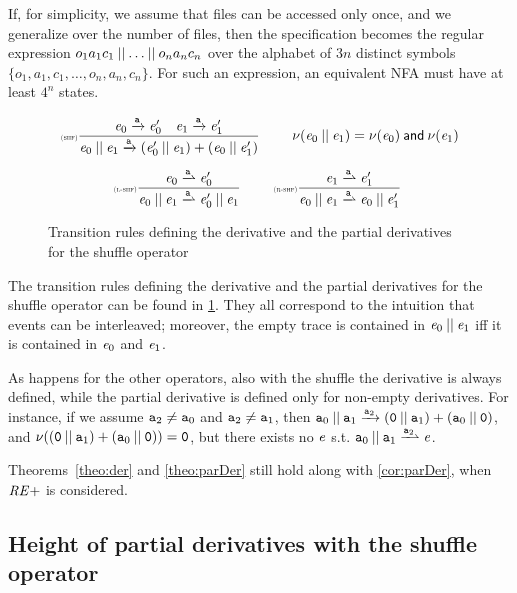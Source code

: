 If, for simplicity, we assume that files can be accessed only once, and we generalize over the number of files, then the specification becomes the regular expression $o_1 a_1 c_1\mathbin{||}\ldots\mathbin{||} o_n a_n  c_n$ over the alphabet of $3n$ distinct symbols $\{o_1,a_1,c_1,\dots, o_n,a_n,c_n\}$. For such an expression, an equivalent NFA must have at least
$4^n$ states.

\begin{figure}[h]
 $$
  \begin{array}{c}
   \Rule{shf}{\re_0\der{\sym}\re'_0\quad\re_1\der{\sym}\re'_1}{\re_0\shuffleop\re_1\der{\sym}(\re'_0\shuffleop\re_1)\orop(\re_0\shuffleop\re'_1)}{}\qquad \hasEps{\re_0\shuffleop\re_1}=\hasEps{\re_0}\conj\hasEps{\re_1} \\[4ex]
   \Rule{l-shf}{\re_0\parDer{\sym}\re'_0}{\re_0\shuffleop\re_1\parDer{\sym}\re'_0\shuffleop\re_1}{} \qquad
   \Rule{r-shf}{\re_1\parDer{\sym}\re'_1}{\re_0\shuffleop\re_1\parDer{\sym}\re_0\shuffleop\re'_1}{}
  \end{array}
 $$
 \caption{Transition rules defining the derivative and the partial derivatives for the shuffle operator}
 \label{fig:shfParDer}
\end{figure}

The transition rules defining the derivative and the partial derivatives for the shuffle operator
can be found in \cref{fig:shfParDer}. They all correspond to the intuition that events can be interleaved; moreover, the empty trace is contained in $\mathit {e}_0\mathbin{||}\mathit {e}_1$ iff it is contained in $\mathit {e}_0$ and $\mathit {e}_1$.

As happens for the other operators, also with the shuffle  the derivative is always defined, while the partial derivative is defined only for non-empty derivatives. For instance, if we assume $\mathtt {a}_2\neq\mathtt {a}_0$ and $\mathtt {a}_2\neq\mathtt {a}_1$, then
$\mathtt {a}_0\mathbin{||} \mathtt {a}_1\xrightarrow{\mathtt {a}_2}(\mathtt {0}\mathbin{||}\mathtt {a}_1)\mathbin{+}(\mathtt {a}_0\mathbin{||}\mathtt {0})$, and $\nu({(\mathtt {0}\mathbin{||}\mathtt {a}_1)\mathbin{+}(\mathtt {a}_0\mathbin{||}\mathtt {0})})=\mathtt {0}$, but there exists no $\mathit {e}$ s.t.
$\sym_0\shuffleop \sym_1\parDer{\sym_2}\re$.

Theorems~\ref{theo:der} and \ref{theo:parDer} still hold along with \cref{cor:parDer}, when $\mathit {RE+}$ is considered.

\subsection{Height of partial derivatives with the shuffle operator}


